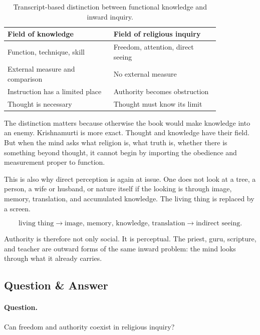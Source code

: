 \documentclass[11pt,oneside]{book}
\begin{document}
\begin{table}
\centering
\begin{tabular}{p{0.42\linewidth}p{0.42\linewidth}}
\hline
\textbf{Field of knowledge} & \textbf{Field of religious inquiry} \\
\hline
Function, technique, skill & Freedom, attention, direct seeing \\
External measure and comparison & No external measure \\
Instruction has a limited place & Authority becomes obstruction \\
Thought is necessary & Thought must know its limit \\
\hline
\end{tabular}
\caption{Transcript-based distinction between functional knowledge and inward inquiry.}
\end{table}

The distinction matters because otherwise the book would make knowledge into an enemy. Krishnamurti is more exact. Thought and knowledge have their field. But when the mind asks what religion is, what truth is, whether there is something beyond thought, it cannot begin by importing the obedience and measurement proper to function.

This is also why direct perception is again at issue. One does not look at a tree, a person, a wife or husband, or nature itself if the looking is through image, memory, translation, and accumulated knowledge. The living thing is replaced by a screen.

\begin{equation}
\text{living thing}
\longrightarrow
\text{image, memory, knowledge, translation}
\longrightarrow
\text{indirect seeing}.
\end{equation}

Authority is therefore not only social. It is perceptual. The priest, guru, scripture, and teacher are outward forms of the same inward problem: the mind looks through what it already carries.

\subsection{Question \& Answer}

\paragraph{Question.}
Can freedom and authority coexist in religious inquiry?
\end{document}
